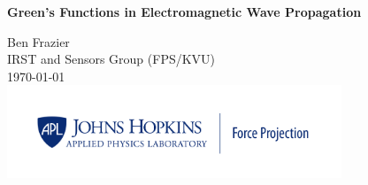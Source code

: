 \titlepage
\begin{center}
\vspace*{50pt}
{\huge \bfseries Green's Functions in Electromagnetic Wave Propagation\\}

\vspace{75 pt}

\Large Ben Frazier \\
\large IRST and Sensors Group (FPS/KVU)\\
\vspace{25pt}
\large \today \\
\vspace{50pt}
\includegraphics[width=0.75\textwidth]{../media/FP_Blue.png}

\end{center}

